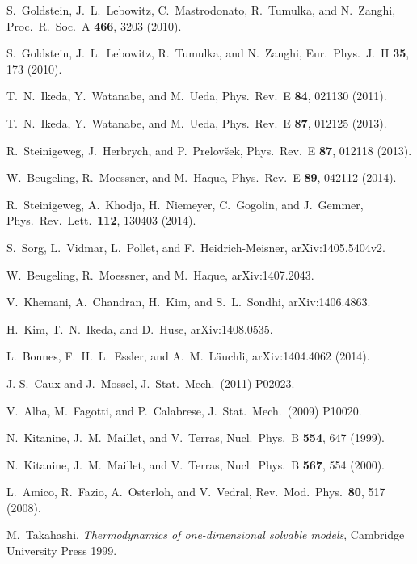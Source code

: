 \documentclass[twocolumn,superscriptaddress,prb,10pt]{revtex4-1}
\begin{document}
\begin{thebibliography}{99}
S.~Goldstein, J.~L.~Lebowitz, C.~Mastrodonato, R.~Tumulka, and 
N.~Zanghi, Proc.\ R.\ Soc.\ A {\bf 466}, 3203 (2010).

S.~Goldstein, J.~L.~Lebowitz, R.~Tumulka, and N.~Zanghi, 
Eur.\ Phys.\ J.\ H {\bf 35}, 173 (2010). 

T.~N.~Ikeda, Y.~Watanabe, and M.~Ueda, Phys.\ Rev.\ E {\bf 84}, 
021130 (2011). 

T.~N.~Ikeda, Y.~Watanabe, and M.~Ueda, Phys.\ Rev.\ E {\bf 87}, 
012125 (2013). 

    R.~Steinigeweg, J.~Herbrych, and P.~Prelov\v{s}ek, Phys.\ Rev.\ E 
{\bf 87}, 012118 (2013).

W.~Beugeling, R.~Moessner, and M.~Haque, Phys.\ Rev.\ E {\bf 89}, 
042112 (2014). 

R.~Steinigeweg, A.~Khodja, H.~Niemeyer, C.~Gogolin, and 
J.~Gemmer, Phys.\ Rev.\ Lett.\ {\bf 112}, 130403 (2014). 

S.~Sorg, L.~Vidmar, L.~Pollet, and F.~Heidrich-Meisner, 
arXiv:1405.5404v2. 

W.~Beugeling, R.~Moessner, and M.~Haque, arXiv:1407.2043. 

V.~Khemani, A.~Chandran, H.~Kim, and S.~L.~Sondhi, 
arXiv:1406.4863. 

H.~Kim, T.~N.~Ikeda, and D.~Huse, arXiv:1408.0535. 


L.~Bonnes, F.~H.~L.~Essler, and A.~M.~L\"auchli, arXiv:1404.4062 (2014).

J.-S.~Caux and J.~Mossel, J.\ Stat.\ Mech.\ (2011) P02023. 

V.~Alba, M.~Fagotti, and P.~Calabrese, J.\ Stat.\ Mech.\ (2009) 
P10020. 

N.~Kitanine, J.~M.~Maillet, and V.~Terras, Nucl.\ Phys.\ B {\bf 554}, 
647 (1999).

N.~Kitanine, J.~M.~Maillet, and V.~Terras, Nucl.\ Phys.\ B {\bf 567}, 
554 (2000).

 L.~Amico, R.~Fazio, 
A.~Osterloh, and V.~Vedral, Rev.\ Mod.\ Phys.\ {\bf 80}, 517 (2008).

M.~Takahashi, {\it Thermodynamics of one-dimensional solvable models}, 
Cambridge University Press 1999. 


\end{thebibliography}
\end{document}

